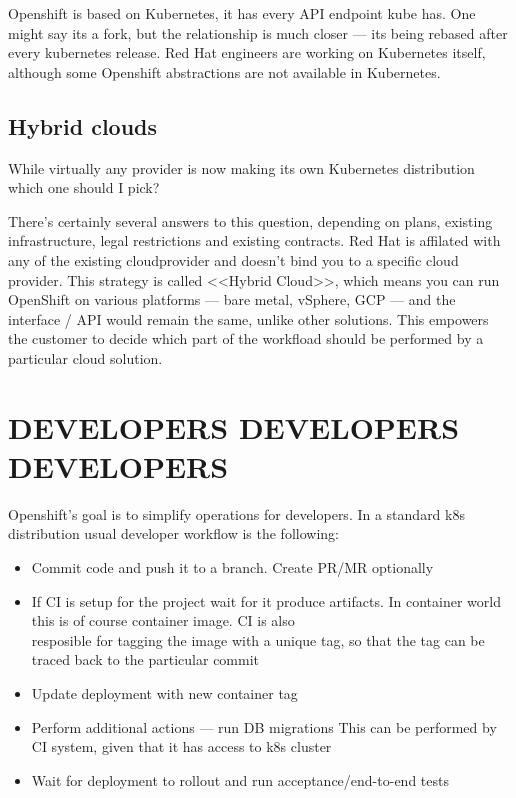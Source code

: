 \documentclass[10pt, a5paper]{article}
\begin{document}
Openshift is based on Kubernetes, it has every API endpoint kube has. One might say its a fork,
but the relationship is much closer --- its being rebased after every kubernetes release. Red Hat
engineers are working on Kubernetes itself, although some Openshift abstraсtions are not available
in Kubernetes.

\subsection*{Hybrid clouds}

While virtually any provider is now making its own Kubernetes distribution which one should I pick?

There's certainly several answers to this question, depending on plans, existing infrastructure,
legal restrictions and existing contracts. Red Hat is affilated with any of the existing cloudprovider
and doesn't bind you to a specific cloud provider. This strategy is called <<Hybrid Cloud>>, which means
you can run OpenShift on various platforms --- bare metal, vSphere, GCP --- and the interface / API would
remain the same, unlike other solutions. This empowers the customer to decide which part of the workfload
should be performed by a particular cloud solution.

\section*{DEVELOPERS DEVELOPERS \\ DEVELOPERS}

Openshift's goal is to simplify operations for developers. In a \linebreak standard k8s distribution usual developer workflow is the following:

\begin{itemize}
  \item Commit code and push it to a branch. Create PR/MR optionally
  \item If CI is setup for the project wait for it produce artifacts.
  In container world this is of course container image. CI is also \\resposible for tagging the image
  with a unique tag, so that the tag can be traced back to the particular commit
  \item Update deployment with new container tag
  \item Perform additional actions --- run DB migrations
  This can be performed by CI system, given that it has access to k8s cluster
  \item Wait for deployment to rollout and run acceptance/end-to-end tests
\end{itemize}
\end{document}

